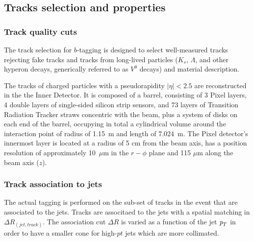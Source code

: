 \begin{itemize}
\subsection{Tracks selection and properties}\label{sec:ObjSelection}

\subsubsection{Track quality cuts}


The track selection for $b$-tagging is designed to select well-measured tracks rejecting fake tracks and tracks from long-lived particles ($K_s$, $\Lambda$, and other hyperon decays, generically referred to as $V^0$ decays) and material description.

The tracks of charged particles with a pseudorapidity $|\eta| < 2.5$ are reconstructed in the the Inner Detector. It is composed of a barrel, consisting of 3 Pixel layers, 4 double layers of single-sided silicon strip sensors, and 73 layers of Transition Radiation Tracker straws concentric with the beam, plus a system of disks on each end of the barrel, occupying in total a cylindrical volume around the interaction point of radius of 1.15~m and length of 7.024~m. The Pixel detector's innermost layer is located at a radius of 5 cm from the beam axis, has a position resolution of approximately 10~$\mu$m in the $r-\phi$ plane and 115 $\mu$m along the beam axis ($z$). %


\subsubsection{Track association to jets}

The actual tagging is performed on the sub-set of tracks in the event that are associated to the jets. Tracks are associtaed to the jets with a spatial matching in $\Delta R_{(jet,track)}$. The association cut $\Delta R$ is varied as a function of the jet ${\emph{p}_{T}}$ in order to have a smaller cone for high-$pt$ jets which are more collimated.





\end{itemize}
